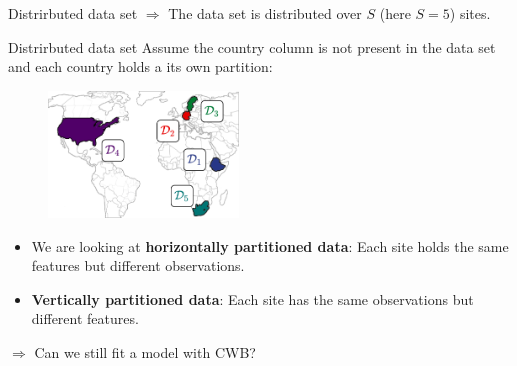 \documentclass[t,10pt]{beamer}
\begin{document}
\begin{frame}{Distrirbuted data set}
  $\Rightarrow$ The data set is distributed over $S$ (here $S = 5$) sites.
\end{frame}

\begin{frame}{Distrirbuted data set}
  Assume the country column is not present in the data set and each country holds a its own partition:
  \vspace{-0.2cm}
  \begin{figure}
    \centering
    \includegraphics[width=0.45\textwidth]{figures/weltkarte.png}
  \end{figure}
  \vspace{-0.5cm}
  \begin{itemize}
    \item We are looking at \textbf{horizontally partitioned data}: Each site holds the same features but different observations.
    \item \textbf{Vertically partitioned data}: Each site has the same observations but different features.
  \end{itemize}
  $\Rightarrow$ Can we still fit a model with CWB?
\end{frame}
\end{document}
